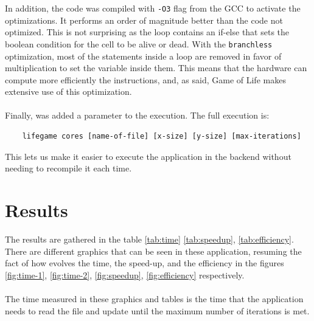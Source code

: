 \documentclass[11pt, a4paper]{article}
\begin{document}
	In addition, the code was compiled with \texttt{-O3} flag from the GCC to activate the optimizations. It performs an order of magnitude better than the code not optimized. This is not surprising as the loop contains an if-else that sets the boolean condition for the cell to be alive or dead. With the \texttt{branchless} optimization, most of the statements inside a loop are removed in favor of multiplication to set the variable inside them. This means that the hardware can compute more efficiently the instructions, and, as said, Game of Life makes extensive use of this optimization.\\
	\\
	Finally, was added a parameter to the execution. The full execution is:
	
	\begin{verbatim}
    lifegame cores [name-of-file] [x-size] [y-size] [max-iterations]
	\end{verbatim}
This lets us make it easier to execute the application in the backend without needing to recompile it each time.
	\section{Results}
	The results are gathered in the table \ref{tab:time} \ref{tab:speedup}, \ref{tab:efficiency}. There are different graphics that can be seen in these application,  resuming the fact of how evolves the time, the speed-up, and the efficiency in the figures \ref{fig:time-1}, \ref{fig:time-2}, \ref{fig:speedup}, \ref{fig:efficiency} respectively.\\
\\
The time measured in these graphics and tables is the time that the application needs to read the file and update until the maximum number of iterations is met. 
	
	
	
	
	
\end{document}
